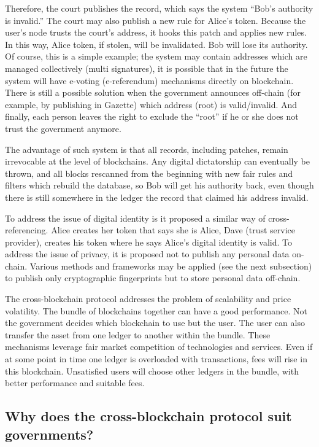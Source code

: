 \begin{multicols}{2}
Therefore, the court publishes the record, which says the system “Bob’s authority is invalid.” The court may also publish a new rule for Alice’s token. Because the user’s node trusts the court’s address, it hooks this patch and applies new rules. In this way, Alice token, if stolen, will be invalidated. Bob will lose its authority. Of course, this is a simple example; the system may contain addresses which are managed collectively (multi signatures), it is possible that in the future the system will have e-voting (e-referendum) mechanisms directly on blockchain. There is still a possible solution when the government announces off-chain (for example, by publishing in Gazette) which address (root) is valid/invalid. And finally, each person leaves the right to exclude the “root” if he or she does not trust the government anymore.

The advantage of such system is that all records, including patches, remain irrevocable at the level of blockchains. Any digital dictatorship can eventually be thrown, and all blocks rescanned from the beginning with new fair rules and filters which rebuild the database, so Bob will get his authority back, even though there is still somewhere in the ledger the record that claimed his address invalid.

To address the issue of digital identity is it proposed a similar way of cross-referencing. Alice creates her token that says she is Alice, Dave (trust service provider), creates his token where he says Alice’s digital identity is valid. To address the issue of privacy, it is proposed not to publish any personal data on-chain. Various methods and frameworks may be applied (see the next subsection) to publish only cryptographic fingerprints but to store personal data off-chain.

The cross-blockchain protocol addresses the problem of scalability and price volatility. The bundle of blockchains together can have a good performance. Not the government decides which blockchain to use but the user. The user can also transfer the asset from one ledger to another within the bundle. These mechanisms leverage fair market competition of technologies and services. Even if at some point in time one ledger is overloaded with transactions, fees will rise in this blockchain. Unsatisfied users will choose other ledgers in the bundle, with better performance and suitable fees.

\subsection{Why does the cross-blockchain protocol suit governments?}\label{subsec-5.2}


\end{multicols}
